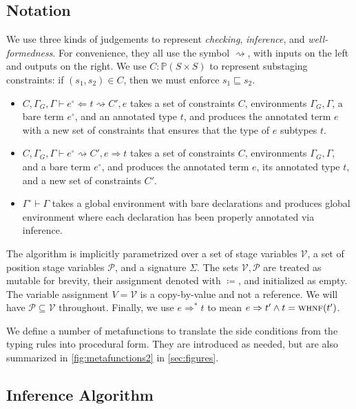 \documentclass[nonacm,screen,10pt]{acmart}
\begin{document}
\subsection{Notation}

We use three kinds of judgements to represent \textit{checking}, \textit{inference}, and \textit{well-formed\-ness}. For convenience, they all use the symbol $\rightsquigarrow$, with inputs on the left and outputs on the right. We use $C : \mathbb{P}(S \times S)$ to represent substaging constraints: if $(s_1, s_2) \in C$, then we must enforce $s_1 \sqsubseteq s_2$.
\begin{itemize}
    \item $C, \Gamma_G, \Gamma \vdash e^\circ \Leftarrow t \rightsquigarrow C', e$ takes a set of constraints $C$, environments $\Gamma_G, \Gamma$, a bare term $e^\circ$, and an annotated type $t$, and produces the annotated term $e$ with a new set of constraints that ensures that the type of $e$ subtypes $t$.
    \item $C, \Gamma_G, \Gamma \vdash e^\circ \rightsquigarrow C', e \Rightarrow t$ takes a set of constraints $C$, environments $\Gamma_G, \Gamma$, and a bare term $e^\circ$, and produces the annotated term $e$, its annotated type $t$, and a new set of constraints $C'$.
    \item $\Gamma^\circ \vdash \Gamma$ takes a global environment with bare declarations and produces global environment where each declaration has been properly annotated via inference.
\end{itemize}

The algorithm is implicitly parametrized over a set of stage variables $\mathcal{V}$, a set of position stage variables $\mathcal{P}$, and a signature $\Sigma$. The sets $\mathcal{V}, \mathcal{P}$ are treated as mutable for brevity, their assignment denoted with $\coloneqq$, and initialized as empty. The variable assignment $V = \mathcal{V}$ is a copy-by-value and not a reference. We will have $\mathcal{P} \subseteq \mathcal{V}$ throughout. Finally, we use $e \Rightarrow^* t$ to mean $e \Rightarrow t' \wedge t = \textsc{whnf}(t')$.

We define a number of metafunctions to translate the side conditions from the typing rules into procedural form. They are introduced as needed, but are also summarized in \autoref{fig:metafunctions2} in \autoref{sec:figures}.

\subsection{Inference Algorithm}
\end{document}
